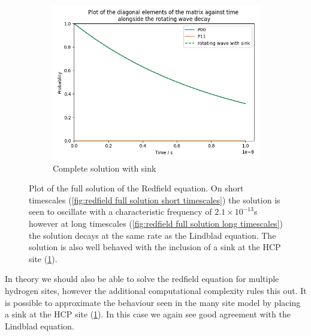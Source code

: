 \begin{figure}[htbp]
\begin{subfigure}{0.45\linewidth}
        \centering
        \includegraphics[width = 0.9\linewidth]{Figures/Redfield/Plot of redfield solution long time sink.png}
        \caption{Complete solution with sink
        }\label{fig:redfield full solution with sink}
    \end{subfigure}
    \caption{Plot of the full solution of the Redfield
    equation. On short timescales
    (\cref{fig:redfield full solution short timescales})
    the solution is seen to
    oscillate with a characteristic
    frequency of \(2.1\times{}10^{-13}\)s however
    at long timescales
    (\cref{fig:redfield full solution long timescales})
    the solution decays at the same rate as the
    Lindblad equation. The solution is
    also well behaved with the inclusion of
    a sink at the HCP site
    (\cref{fig:redfield full solution with sink}).
    }\label{fig:redfield full solution}
\end{figure}
In theory we should also be able
to solve the redfield equation
for multiple hydrogen sites, however
the additional computational complexity
rules this out. It is possible to
approximate the behaviour
seen in the many site model
by placing a sink at
the HCP site
(\cref{fig:redfield full solution with sink}).
In this case
we again see good
agreement with the
Lindblad equation.


